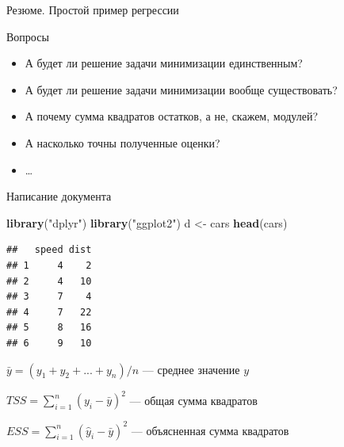 \documentclass[ignorenonframetext,]{beamer}
\newenvironment{Shaded}{\begin{snugshade}}{\end{snugshade}}
\newcommand{\KeywordTok}[1]{\textcolor[rgb]{0.13,0.29,0.53}{\textbf{{#1}}}}
\newcommand{\StringTok}[1]{\textcolor[rgb]{0.31,0.60,0.02}{{#1}}}
\newcommand{\CommentTok}[1]{\textcolor[rgb]{0.56,0.35,0.01}{\textit{{#1}}}}
\newcommand{\NormalTok}[1]{{#1}}
\begin{document}
\begin{frame}{Резюме. Простой пример регрессии}

\end{frame}

\begin{frame}{Вопросы}

\begin{itemize}
\item
  А будет ли решение задачи минимизации единственным?
\item
  А будет ли решение задачи минимизации вообще существовать?
\item
  А почему сумма квадратов остатков, а не, скажем, модулей?
\item
  А насколько точны полученные оценки?
\item
  \ldots{}
\end{itemize}

\end{frame}

\begin{frame}[fragile]{Написание документа}

\begin{Shaded}
\begin{Highlighting}[]
\KeywordTok{library}\NormalTok{(}\StringTok{"dplyr"}\NormalTok{)}
\KeywordTok{library}\NormalTok{(}\StringTok{"ggplot2"}\NormalTok{)}
\NormalTok{d <-}\StringTok{ }\NormalTok{cars }
\KeywordTok{head}\NormalTok{(cars)}
\end{Highlighting}
\end{Shaded}

\begin{verbatim}
##   speed dist
## 1     4    2
## 2     4   10
## 3     7    4
## 4     7   22
## 5     8   16
## 6     9   10
\end{verbatim}

\begin{Shaded}
\begin{Highlighting}[]
\CommentTok{# %
\end{Highlighting}
\end{Shaded}

\end{frame}

\begin{frame}

$\bar{y}=(y_1+y_2+...+y_n)/n$ --- среднее значение $y$

$TSS=\sum_{i=1}^n (y_i-\bar{y})^2$ --- общая сумма квадратов

$ESS=\sum_{i=1}^n (\hat{y}_i-\bar{y})^2$ --- объясненная сумма квадратов

\end{frame}
\end{document}
